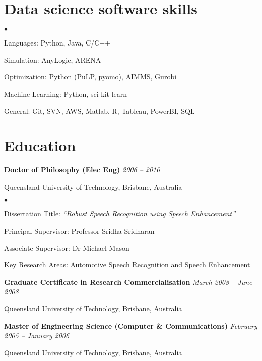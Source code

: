 \documentclass[margin,line]{resume}
\newenvironment{list1}{
  \begin{list}{}{%
      \setlength{\itemsep}{0in}
      \setlength{\parsep}{0in} \setlength{\parskip}{0in}
      \setlength{\topsep}{0in} \setlength{\partopsep}{0in}
      \setlength{\leftmargin}{0.17in}}}{\end{list}}
\newenvironment{list2}{
  \begin{list}{$\bullet$}{%
      \setlength{\itemsep}{0in}
      \setlength{\parsep}{0in} \setlength{\parskip}{0in}
      \setlength{\topsep}{0in} \setlength{\partopsep}{0in}
      \setlength{\leftmargin}{0.2in}}}{\end{list}}
\begin{document}
\begin{resume}
\section{\sc Data science software skills}
\begin{list2}
\item Languages: Python, Java, C/C++
\item Simulation: AnyLogic, ARENA
\item Optimization: Python (PuLP, pyomo), AIMMS, Gurobi
\item Machine Learning: Python, sci-kit learn
\item General: Git, SVN, AWS, Matlab, R, Tableau, PowerBI, SQL
\end{list2}


\newpage

\section{\sc Education}
{\bf Doctor of Philosophy (Elec Eng)} \hfill {\it 2006 -- 2010}\\\vspace{-0.85\baselineskip}
\begin{list1}
\item[] Queensland University of Technology, Brisbane, Australia
\begin{list2}
\item Dissertation Title: {\it ``Robust Speech Recognition using Speech Enhancement''}
\item Principal Supervisor:  Professor Sridha Sridharan
\item Associate Supervisor: Dr Michael Mason
\item Key Research Areas: Automotive Speech Recognition and Speech Enhancement
\end{list2}
\end{list1}

{\bf Graduate Certificate in Research Commercialisation} \hfill {\it March 2008 -- June 2008}\\\vspace{-0.85\baselineskip}
\begin{list1}
\item[] Queensland University of Technology, Brisbane, Australia
\end{list1}

{\bf Master of Engineering Science (Computer \& Communications)} \hfill {\it February 2005 -- January 2006}\\\vspace{-0.85\baselineskip}
\begin{list1}
\item[] Queensland University of Technology, Brisbane, Australia
\end{list1}


\end{resume}
\end{document}
